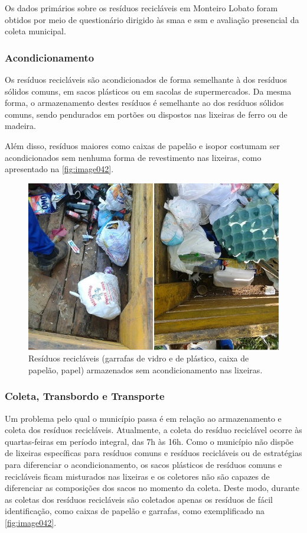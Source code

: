 Os dados primários sobre os resíduos recicláveis em Monteiro Lobato foram obtidos por meio de questionário dirigido às \gls{smaa} e \gls{ssm} e avaliação presencial da coleta municipal.

\subsubsection{Acondicionamento}

Os resíduos recicláveis são acondicionados de forma semelhante à dos resíduos sólidos comuns, em sacos plásticos ou em sacolas de supermercados. Da mesma forma, o armazenamento destes resíduos é semelhante ao dos resíduos sólidos comuns, sendo pendurados em portões ou dispostos nas lixeiras de ferro ou de madeira.

Além disso, resíduos maiores como caixas de papelão e isopor costumam ser acondicionados sem nenhuma forma de revestimento nas lixeiras, como apresentado na \autoref{fig:image042}.

\begin{figure}
	\centering
	\includegraphics[width=0.7\linewidth]{produtos/prodtres/image041}
	\caption{Resíduos recicláveis (garrafas de vidro e de plástico, caixa de papelão, papel) armazenados sem acondicionamento nas lixeiras.}
	\label{fig:image041}
\end{figure}

\subsubsection{Coleta, Transbordo e Transporte}

Um problema pelo qual o município passa é em relação ao armazenamento e coleta dos resíduos recicláveis. Atualmente, a coleta do resíduo reciclável ocorre às quartas-feiras em período integral, das 7h às 16h.
Como o município não dispõe de lixeiras específicas para resíduos comuns e resíduos recicláveis ou de estratégias para diferenciar o acondicionamento, os sacos plásticos de resíduos comuns e recicláveis ficam misturados nas lixeiras e os coletores não são capazes de diferenciar as composições dos sacos no momento da coleta. Deste modo, durante as coletas dos resíduos recicláveis são coletados apenas os resíduos de fácil identificação, como caixas de papelão e garrafas, como exemplificado na \autoref{fig:image042}.

